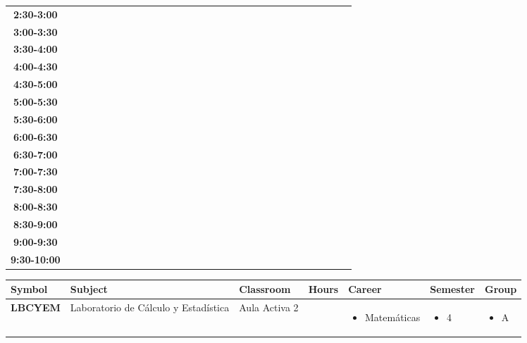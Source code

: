 \documentclass{article}
\begin{document}
\begin{table}[ht]
\begin{tabular}{|c|c|c|c|c|c|c|c|c|c|c|c|c|c|c|c|c|c|c|c|c|c|c|c|c|c|c|c|c|c|}
 \cline{1-8} 
\textbf{2:30-3:00} &   &   &   &   &   &   &   \\
 \cline{1-8} 
\textbf{3:00-3:30} &   &   &   &   &   &   &   \\
 \cline{1-8} 
\textbf{3:30-4:00} &   &   &   &   &   &   &   \\
 \cline{1-8} 
\textbf{4:00-4:30} &   &   &   &   &   &   &   \\
 \cline{1-8} 
\textbf{4:30-5:00} &   &   &   &   &   &   &   \\
 \cline{1-8} 
\textbf{5:00-5:30} &   &   &   &   &   &   &   \\
 \cline{1-8} 
\textbf{5:30-6:00} &   &   &   &   &   &   &   \\
 \cline{1-8} 
\textbf{6:00-6:30} &   &   &   &   &   &   &   \\
 \cline{1-8} 
\textbf{6:30-7:00} &   &   &   &   &   &   &   \\
 \cline{1-8} 
\textbf{7:00-7:30} &   &   &   &   &   &   &   \\
 \cline{1-8} 
\textbf{7:30-8:00} &   &   &   &   &   &   &   \\
 \cline{1-8} 
\textbf{8:00-8:30} &   &   &   &   &   &   &   \\
 \cline{1-8} 
\textbf{8:30-9:00} &   &   &   &   &   &   &   \\
 \cline{1-8} 
\textbf{9:00-9:30} &   &   &   &   &   &   &   \\
 \cline{1-8} 
\textbf{9:30-10:00} &   &   &   &   &   &   &   \\
 \cline{1-8} 
\end{tabular}\end{table}

        
        \begin{tabular}{|>{\centering\arraybackslash}m{2cm}|>{\centering\arraybackslash}m{4cm}|>{\centering\arraybackslash}m{2cm}|>{\centering\arraybackslash}m{2cm}|>{\centering\arraybackslash}m{2cm}|>{\centering\arraybackslash}m{2cm}|>{\centering\arraybackslash}m{2cm}|}
        \hline
        \textbf{Symbol} & \textbf{Subject} & \textbf{Classroom} & \textbf{Hours} & \textbf{Career} & \textbf{Semester} & \textbf{Group} \\
        \hline
        
            \hline
            \cellcolor[rgb]{0.9764705882352941,0.8392156862745098,0.9529411764705882} \textbf{LBCYEM} & Laboratorio de C\'alculo y Estad\'istica & Aula Activa 2 & 3.0 & \begin{itemize}[left=0pt,align=left]\item Matem\'aticas 
\end{itemize} & \begin{itemize}[left=0pt,align=left]\item 4 
\end{itemize} & \begin{itemize}[left=0pt,align=left]\item A 
\end{itemize}  \\
            \hline
            \end{tabular}
                    
\end{document}
